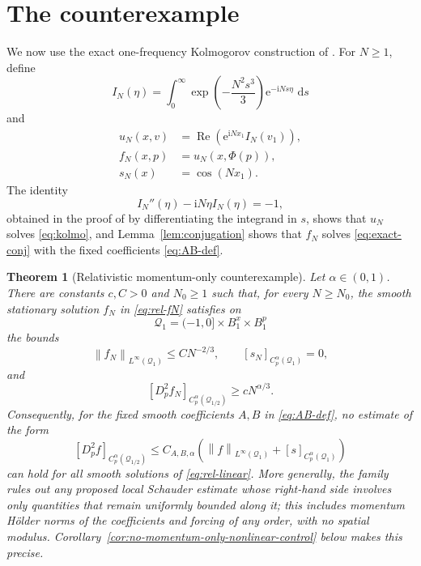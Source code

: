 \documentclass[10pt,a4paper]{amsart}
\numberwithin{equation}{section}
\newtheorem{theorem}{Theorem}[section]
\newcommand{\ii}{\mathrm{i}}
\newcommand{\e}{\mathrm{e}}
\newcommand{\dd}{\,\mathrm{d}}
\newcommand{\norm}[1]{\left\|#1\right\|}
\begin{document}
\section{The counterexample}\label{sec:counterexample}

We now use the exact one-frequency Kolmogorov construction of \cite{DW26}.  For $N\ge1$, define
\begin{equation}\label{eq:IN}
   I_N(\eta)=\int_0^\infty
      \exp\!\left(-\frac{N^2s^3}{3}\right)\e^{-\ii Ns\eta}\,\dd s
\end{equation}
and
\begin{equation}\label{eq:rel-fN}
\begin{aligned}
   u_N(x,v)&=\operatorname{Re}\!\left(\e^{\ii Nx_1}I_N(v_1)\right),\\
   f_N(x,p)&=u_N(x,\Phi(p)),\\
   s_N(x)&=\cos(Nx_1).
\end{aligned}
\end{equation}
The identity
\[
   I_N''(\eta)-\ii N\eta I_N(\eta)=-1,
\]
obtained in the proof of \cite[Theorem~2.1]{DW26} by differentiating the integrand in $s$, shows that $u_N$ solves \eqref{eq:kolmo}, and Lemma~\ref{lem:conjugation} shows that $f_N$ solves \eqref{eq:exact-conj} with the fixed coefficients \eqref{eq:AB-def}.


\begin{theorem}[Relativistic momentum-only counterexample]\label{thm:rel-counterexample}
Let $\alpha\in(0,1)$.  There are constants $c,C>0$ and $N_0\ge1$ such that, for every $N\ge N_0$, the smooth stationary solution $f_N$ in \eqref{eq:rel-fN} satisfies on
\[
   \mathcal Q_1=(-1,0]\times B_1^x\times B_1^p
\]
the bounds
\[
   \norm{f_N}_{L^\infty(\mathcal Q_1)}\le CN^{-2/3},
   \qquad
   [s_N]_{C_p^\alpha(\mathcal Q_1)}=0,
\]
and
\[
   [D_p^2f_N]_{C_p^\alpha(\mathcal Q_{1/2})}
   \ge cN^{\alpha/3}.
\]
Consequently, for the fixed smooth coefficients $A,B$ in \eqref{eq:AB-def}, no estimate of the form
\begin{equation}\label{eq:rel-false-est}
   [D_p^2f]_{C_p^\alpha(\mathcal Q_{1/2})}
   \le C_{A,B,\alpha}
   \left(\norm f_{L^\infty(\mathcal Q_1)}+[s]_{C_p^\alpha(\mathcal Q_1)}\right)
\end{equation}
can hold for all smooth solutions of \eqref{eq:rel-linear}.  More generally, the family rules out any proposed local Schauder estimate whose right-hand side involves only quantities that remain uniformly bounded along it; this includes momentum H\"older norms of the coefficients and forcing of any order, with no spatial modulus.  Corollary~\ref{cor:no-momentum-only-nonlinear-control} below makes this precise.
\end{theorem}
\end{document}
